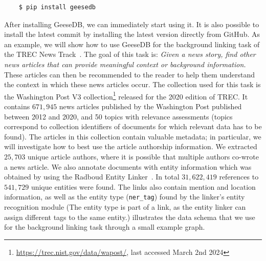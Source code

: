 \begin{verbatim}
	$ pip install geesedb
\end{verbatim}
After installing GeeseDB, we can immediately start using it. It is also possible to install the latest commit by installing the latest version directly from GitHub.
As an example, we will show how to use GeeseDB for the background linking task of the TREC News Track~\citep{soboroff2018trec}. The goal of this task is: \textit{Given a news story, find other news articles that can provide meaningful context or background information.} These articles can then be recommended to the reader to help them understand the context in which these news articles occur. The collection used for this task is the Washington Post V3 collection\footnote{\url{https://trec.nist.gov/data/wapost/}, last accessed March 2nd 2024} released for the 2020 edition of TREC. It contains $671,945$ news articles published by the Washington Post published between 2012 and 2020, and 50 topics with relevance assessments (topics correspond to collection identifiers of documents for which relevant data has to be found). The articles in this collection contain valuable metadata; in particular, we will investigate how to best use the article authorship information. We extracted $25,703$ unique article authors, where it is possible that multiple authors co-wrote a news article. We also annotate documents with entity information which was obtained by using the Radboud Entity Linker~\citep{rel}. In total $31,622,419$ references to $541,729$ unique entities were found. The links also contain mention and location information, as well as the entity type (\texttt{ner\_tag}) found by the linker's entity recognition module (The entity type is part of a link, as the entity linker can assign different tags to the same entity.)  illustrates the data schema that we use for the background linking task through a small example graph. 

